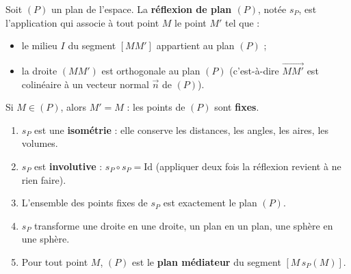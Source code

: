 \documentclass[11pt]{article}
\newcommand{\legende}[1]{\par\vspace{6pt}{\popsemi\fontsize{9}{11.5}\selectfont\color{popmuted}#1}}
\begin{document}
\begin{definition}
Soit $(P)$ un plan de l'espace. La \textbf{réflexion de plan $(P)$}, notée $s_{P}$, est l'application qui associe à tout point $M$ le point $M'$ tel que :
\begin{itemize}
\item le milieu $I$ du segment $[MM']$ appartient au plan $(P)$ ;
\item la droite $(MM')$ est orthogonale au plan $(P)$ (c'est-à-dire $\overrightarrow{MM'}$ est colinéaire à un vecteur normal $\vec{n}$ de $(P)$).
\end{itemize}
Si $M\in(P)$, alors $M'=M$ : les points de $(P)$ sont \textbf{fixes}.
\end{definition}

\begin{popfigure}
\legende{La réflexion $s_{P}$ : $I$ milieu de $[MM']$ et $(MM')\perp(P)$.}
\end{popfigure}

\begin{propriete}
\begin{enumerate}
\item $s_{P}$ est une \textbf{isométrie} : elle conserve les distances, les angles, les aires, les volumes.
\item $s_{P}$ est \textbf{involutive} : $s_{P}\circ s_{P} = \mathrm{Id}$ (appliquer deux fois la réflexion revient à ne rien faire).
\item L'ensemble des points fixes de $s_{P}$ est exactement le plan $(P)$.
\item $s_{P}$ transforme une droite en une droite, un plan en un plan, une sphère en une sphère.
\item Pour tout point $M$, $(P)$ est le \textbf{plan médiateur} du segment $[M\,s_{P}(M)]$.
\end{enumerate}
\end{propriete}
\end{document}
